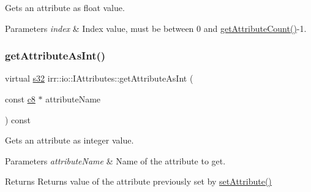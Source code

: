 Gets an attribute as float value. 


\begin{DoxyParams}{Parameters}
{\em index} & Index value, must be between 0 and \hyperlink{classirr_1_1io_1_1IAttributes_a796bdd9440ee7ba0b6742a90a82870b6}{get\+Attribute\+Count()}-\/1. \\
\hline
\end{DoxyParams}
\mbox{\label{classirr_1_1io_1_1IAttributes_ac6c51254c9d43cb58cb89866cdd210ed}} 
\subsubsection{\texorpdfstring{get\+Attribute\+As\+Int()}{getAttributeAsInt()}\hspace{0.1cm}{\footnotesize\ttfamily [1/2]}}
{\footnotesize\ttfamily virtual \hyperlink{namespaceirr_ac66849b7a6ed16e30ebede579f9b47c6}{s32} irr\+::io\+::\+I\+Attributes\+::get\+Attribute\+As\+Int (\begin{DoxyParamCaption}\item[{const \hyperlink{namespaceirr_a9395eaea339bcb546b319e9c96bf7410}{c8} $\ast$}]{attribute\+Name }\end{DoxyParamCaption}) const\hspace{0.3cm}{\ttfamily [pure virtual]}}



Gets an attribute as integer value. 


\begin{DoxyParams}{Parameters}
{\em attribute\+Name} & Name of the attribute to get. \\
\hline
\end{DoxyParams}
\begin{DoxyReturn}{Returns}
Returns value of the attribute previously set by \hyperlink{classirr_1_1io_1_1IAttributes_a03fa31acb481ae23678676cc183f09a6}{set\+Attribute()} 
\end{DoxyReturn}
\mbox{\label{classirr_1_1io_1_1IAttributes_a71aab77245c8cfc02b547d1031548006}} 
